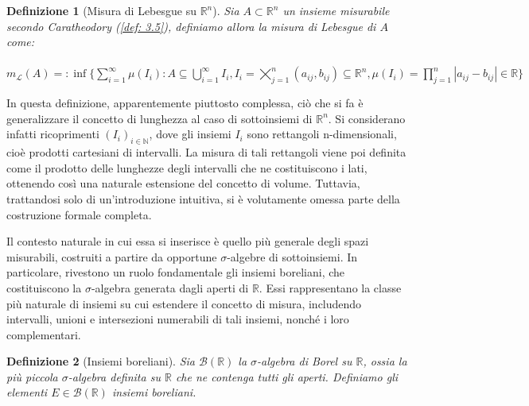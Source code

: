 \documentclass[a4paper,12pt]{report}
\newtheorem{definizione}{Definizione}[chapter]
\begin{document}
\begin{definizione}[Misura di Lebesgue su $\mathbb{R}^n$]\label{def: 3.6}
    Sia $A\subset \mathbb{R}^n$ un insieme misurabile secondo Caratheodory (\ref{def: 3.5}), definiamo allora la misura di Lebesgue di $A$ come:
    \\
    \\ $m_{\mathscr{L}}(A)=:\inf\bigg\{\displaystyle\sum_{i=1}^\infty \mu(I_i)  : A\subseteq\bigcup_{i=1}^\infty I_i, I_i=\displaystyle\bigtimes_{j=1}^n(a_{ij},b_{ij}) \subseteq \mathbb{R}^n, \mu(I_i)=\prod_{j=1}^n|a_{ij}-b_{ij}|\in \mathbb{R}\bigg\}$
\end{definizione}

In questa definizione, apparentemente piuttosto complessa, ciò che si fa è generalizzare il concetto di lunghezza al caso di sottoinsiemi di $\mathbb{R}^n$. Si considerano infatti ricoprimenti $(I_i)_{i \in \mathbb{N}}$, dove gli insiemi $I_i$ sono rettangoli n-dimensionali, cioè prodotti cartesiani di intervalli. La misura di tali rettangoli viene poi definita come il prodotto delle lunghezze degli intervalli che ne costituiscono i lati, ottenendo così una naturale estensione del concetto di volume.  Tuttavia, trattandosi solo di un’introduzione intuitiva, si è volutamente omessa parte della costruzione formale completa.

Il contesto naturale in cui essa si inserisce è quello più generale degli spazi misurabili, costruiti a partire da opportune $\sigma$-algebre di sottoinsiemi.
In particolare, rivestono un ruolo fondamentale gli insiemi boreliani, che costituiscono la $\sigma$-algebra generata dagli aperti di $\mathbb{R}$. Essi rappresentano la classe più naturale di insiemi su cui estendere il concetto di misura, includendo intervalli, unioni e intersezioni numerabili di tali insiemi, nonché i loro complementari.

\begin{definizione}[Insiemi boreliani] Sia  $\mathcal{B}(\mathbb{R})$ la $\sigma$-algebra di Borel su $\mathbb{R}$, ossia la più piccola $\sigma$-algebra definita su $\mathbb{R}$ che ne contenga tutti gli aperti. Definiamo gli elementi $E\in \mathcal{B}(\mathbb{R})$ insiemi boreliani.
\end{definizione}
\end{document}

